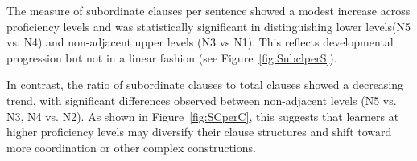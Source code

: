 
The measure of subordinate clauses per sentence showed a modest increase across proficiency levels and was
statistically significant in distinguishing lower levels(N5 vs. N4) and non-adjacent upper levels (N3 vs N1). This
reflects developmental progression but not in a linear fashion (see Figure~\ref{fig:SubclperS}).

In contrast, the ratio of subordinate clauses to total clauses showed a decreasing trend, with significant
differences observed between non-adjacent levels (N5 vs. N3, N4 vs. N2).  As shown in Figure~\ref{fig:SCperC}, this
suggests that learners at higher proficiency levels may diversify their clause structures and shift toward more
coordination or other complex constructions.

